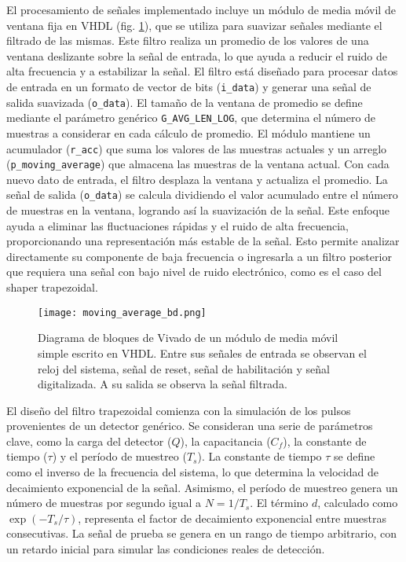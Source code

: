 \documentclass{report}
\begin{document}
\noindent El procesamiento de señales implementado incluye un módulo de media móvil de ventana fija en VHDL (fig.  \ref{fig:MA_bd}), que se utiliza para suavizar señales mediante el filtrado de las mismas. Este filtro realiza un promedio de los valores de una ventana deslizante sobre la señal de entrada, lo que ayuda a reducir el ruido de alta frecuencia y a estabilizar la señal. El filtro está diseñado para procesar datos de entrada en un formato de vector de bits (\texttt{i\_data}) y generar una señal de salida suavizada (\texttt{o\_data}). El tamaño de la ventana de promedio se define mediante el parámetro genérico \texttt{G\_AVG\_LEN\_LOG}, que determina el número de muestras a considerar en cada cálculo de promedio. El módulo mantiene un acumulador (\texttt{r\_acc}) que suma los valores de las muestras actuales y un arreglo (\texttt{p\_moving\_average}) que almacena las muestras de la ventana actual. Con cada nuevo dato de entrada, el filtro desplaza la ventana y actualiza el promedio. La señal de salida (\texttt{o\_data}) se calcula dividiendo el valor acumulado entre el número de muestras en la ventana, logrando así la suavización de la señal. Este enfoque ayuda a eliminar las fluctuaciones rápidas y el ruido de alta frecuencia, proporcionando una representación más estable de la señal. Esto permite analizar directamente su componente de baja frecuencia o ingresarla a un filtro posterior que requiera una señal con bajo nivel de ruido electrónico, como es el caso del shaper trapezoidal.

\begin{figure}[h]
    \centering
    \texttt{[image: moving\_average\_bd.png]}
    \caption{Diagrama de bloques de Vivado de un módulo de media móvil simple escrito en VHDL. Entre sus señales de entrada se observan el reloj del sistema, señal de reset, señal de habilitación y señal digitalizada. A su salida se observa la señal filtrada.}
    \label{fig:MA_bd}
\end{figure}

\noindent El diseño del filtro trapezoidal comienza con la simulación de los pulsos provenientes de un detector genérico. Se consideran una serie de parámetros clave, como la carga del detector (\( Q \)), la capacitancia (\( C_f \)), la constante de tiempo (\( \tau \)) y el período de muestreo (\( T_s \)). La constante de tiempo \( \tau \) se define como el inverso de la frecuencia del sistema, lo que determina la velocidad de decaimiento exponencial de la señal. Asimismo, el período de muestreo genera un número de muestras por segundo igual a \( N = 1/T_s \). El término \( d \), calculado como \( \exp(-T_s/\tau) \), representa el factor de decaimiento exponencial entre muestras consecutivas. La señal de prueba se genera en un rango de tiempo arbitrario, con un retardo inicial para simular las condiciones reales de detección.\\
\end{document}
